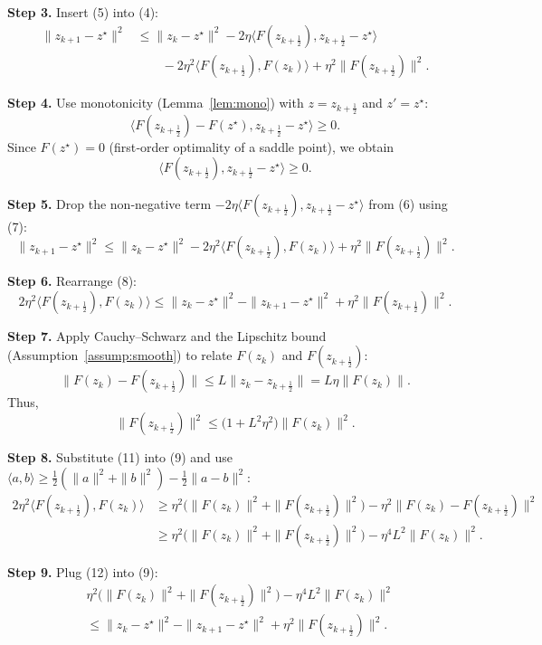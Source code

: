 \documentclass{article}
\begin{document}
\noindent\textbf{Step 3.} Insert (5) into (4):
\[
\begin{aligned}
\|z_{k+1}-z^{\star}\|^{2}
&\le\|z_{k}-z^{\star}\|^{2}
-2\eta\langle F(z_{k+\frac12}),z_{k+\frac12}-z^{\star}\rangle   \\
&\qquad-2\eta^{2}\langle F(z_{k+\frac12}),F(z_{k})\rangle
+\eta^{2}\|F(z_{k+\frac12})\|^{2}.
\end{aligned}
\tag{6}
\]

\noindent\textbf{Step 4.} Use monotonicity (Lemma~\ref{lem:mono}) with $z=z_{k+\frac12}$ and $z'=z^{\star}$:
\[
\langle F(z_{k+\frac12})-F(z^{\star}),z_{k+\frac12}-z^{\star}\rangle\ge0.
\]
Since $F(z^{\star})=0$ (first‑order optimality of a saddle point), we obtain
\[
\langle F(z_{k+\frac12}),z_{k+\frac12}-z^{\star}\rangle\ge0.
\tag{7}
\]

\noindent\textbf{Step 5.} Drop the non‑negative term $-2\eta\langle F(z_{k+\frac12}),z_{k+\frac12}-z^{\star}\rangle$ from (6) using (7):
\[
\|z_{k+1}-z^{\star}\|^{2}
\le\|z_{k}-z^{\star}\|^{2}
-2\eta^{2}\langle F(z_{k+\frac12}),F(z_{k})\rangle
+\eta^{2}\|F(z_{k+\frac12})\|^{2}.
\tag{8}
\]

\noindent\textbf{Step 6.} Rearrange (8):
\[
2\eta^{2}\langle F(z_{k+\frac12}),F(z_{k})\rangle
\le\|z_{k}-z^{\star}\|^{2}-\|z_{k+1}-z^{\star}\|^{2}
+\eta^{2}\|F(z_{k+\frac12})\|^{2}.
\tag{9}
\]

\noindent\textbf{Step 7.} Apply Cauchy–Schwarz and the Lipschitz bound (Assumption~\ref{assump:smooth}) to relate $F(z_{k})$ and $F(z_{k+\frac12})$:
\[
\|F(z_{k})-F(z_{k+\frac12})\|\le L\|z_{k}-z_{k+\frac12}\|
= L\eta\|F(z_{k})\|.
\tag{10}
\]
Thus,
\[
\|F(z_{k+\frac12})\|^{2}
\le\bigl(1+L^{2}\eta^{2}\bigr)\|F(z_{k})\|^{2}.
\tag{11}
\]

\noindent\textbf{Step 8.} Substitute (11) into (9) and use $\langle a,b\rangle\ge\frac12(\|a\|^{2}+\|b\|^{2})-\frac12\|a-b\|^{2}$:
\[
\begin{aligned}
2\eta^{2}\langle F(z_{k+\frac12}),F(z_{k})\rangle
&\ge \eta^{2}\bigl(\|F(z_{k})\|^{2}+\|F(z_{k+\frac12})\|^{2}\bigr)
-\eta^{2}\|F(z_{k})-F(z_{k+\frac12})\|^{2}\\
&\ge \eta^{2}\bigl(\|F(z_{k})\|^{2}+\|F(z_{k+\frac12})\|^{2}\bigr)
-\eta^{4}L^{2}\|F(z_{k})\|^{2}.
\end{aligned}
\tag{12}
\]

\noindent\textbf{Step 9.} Plug (12) into (9):
\[
\begin{aligned}
&\eta^{2}\bigl(\|F(z_{k})\|^{2}+\|F(z_{k+\frac12})\|^{2}\bigr)
-\eta^{4}L^{2}\|F(z_{k})\|^{2}\\
&\le\|z_{k}-z^{\star}\|^{2}-\|z_{k+1}-z^{\star}\|^{2}
+\eta^{2}\|F(z_{k+\frac12})\|^{2}.
\end{aligned}
\tag{13}
\]
\end{document}
